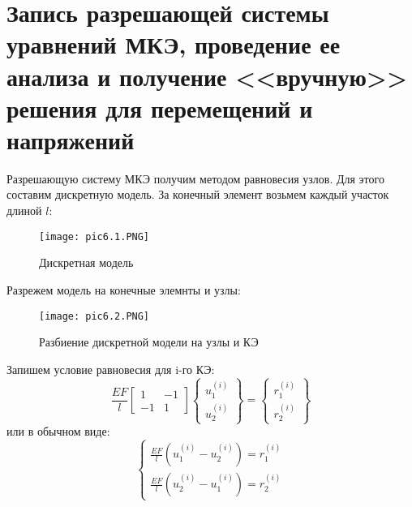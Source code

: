 \section{Запись разрешающей системы уравнений МКЭ, проведение ее анализа и получение <<вручную>> решения для перемещений и напряжений}

Разрешающую систему МКЭ получим методом равновесия узлов. Для этого составим дискретную модель. За конечный элемент возьмем каждый участок длиной $l$:
\begin{figure}[H]
    \begin{center}
        \texttt{[image: pic6.1.PNG]}
        \caption{Дискретная модель}
        \label{pic6.1}
    \end{center}
\end{figure}

Разрежем модель на конечные элемнты и узлы:
\begin{figure}[H]
    \begin{center}
        \texttt{[image: pic6.2.PNG]}
        \caption{Разбиение дискретной модели на узлы и КЭ}
        \label{pic6.2}
    \end{center}
\end{figure}

Запишем условие равновесия для i-го КЭ:
\begin{equation}
    \label{eq6.1}
    \frac{EF}{l}
    \begin{bmatrix}
        1 & -1
        \\
        -1 & 1
    \end{bmatrix}
    \begin{Bmatrix}
        u_{1}^{(i)}
        \\
        u_{2}^{(i)}
    \end{Bmatrix}
    = 
    \begin{Bmatrix}
        r_{1}^{(i)}
        \\
        r_{2}^{(i)}
    \end{Bmatrix}
\end{equation}
или в обычном виде:
\begin{equation}
    \label{eq6.2}
    \begin{cases}
        \displaystyle \frac{EF}{l} (u_1^{(i)} - u_2^{(i)}) = r_1^{(i)}
        \\[10pt]
        \displaystyle \frac{EF}{l} (u_2^{(i)} - u_1^{(i)}) = r_2^{(i)}
    \end{cases}
\end{equation}


